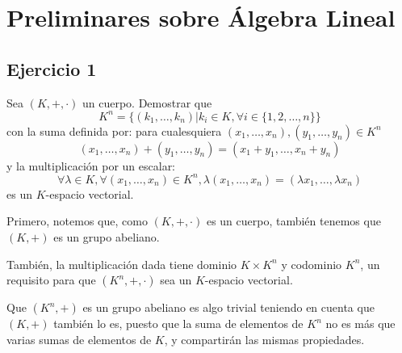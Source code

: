 \chapter{Preliminares sobre Álgebra Lineal}

\section{Ejercicio 1}

\begin{formulationBox}
	Sea $(K, +, \cdot)$ un cuerpo. Demostrar que
	\[K^n = \{(k_1,\dots,k_n)|k_i\in K, \forall i\in\{1, 2, \dots, n\}\}\]
	con la suma definida por: para cualesquiera $(x_1, \dots, x_n), (y_1, \dots, y_n) \in K^n$
	\[(x_1, \dots, x_n) + (y_1, \dots, y_n) = (x_1+y_1, \dots, x_n+y_n)\]
	y la multiplicación por un escalar:
	\[\forall\lambda\in K, \forall(x_1, \dots, x_n)\in K^n, \lambda(x_1, \dots, x_n) = (\lambda x_1, \dots, \lambda x_n)\]
	es un $K$-espacio vectorial.
\end{formulationBox}

Primero, notemos que, como $(K, +, \cdot)$ es un cuerpo, también tenemos que $(K, +)$ es un grupo abeliano.

También, la multiplicación dada tiene dominio $K\times K^n$ y codominio $K^n$, un requisito para que $(K^n, +, \cdot)$ sea un $K$-espacio vectorial.

Que $(K^n, +)$ es un grupo abeliano es algo trivial teniendo en cuenta que $(K, +)$ también lo es, puesto que la suma de elementos de $K^n$ no es más que varias sumas de elementos de $K$, y compartirán las mismas propiedades.


